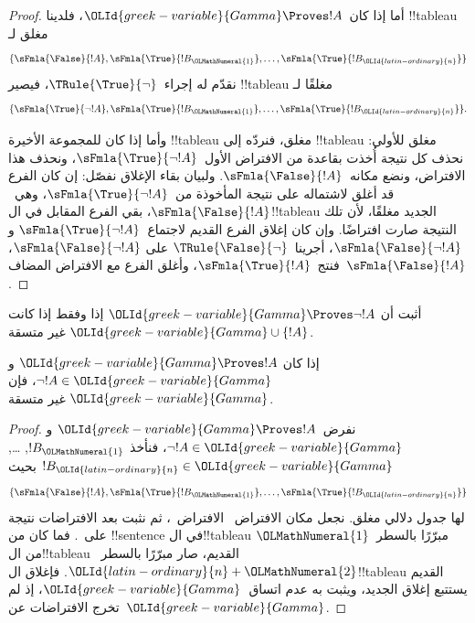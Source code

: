 \documentclass[../../../include/open-logic-section]{subfiles}
\begin{document}
\begin{proof}
أما إذا كان~$\OLId{greek-variable}{Gamma} \Proves !A$، فلدينا !!{tableau} مغلق لـ
\[
\{\sFmla{\False}{!A},
\sFmla{\True}{!B_\OLMathNumeral{1}}, \dots, \sFmla{\True}{!B_\OLId{latin-ordinary}{n}}\}
\]
نقدّم له إجراء~$\TRule{\True}{\lnot}$، فيصير !!{tableau} مغلقًا لـ
\[
\{\sFmla{\True}{\lnot !A},
\sFmla{\True}{!B_\OLMathNumeral{1}}, \dots, \sFmla{\True}{!B_\OLId{latin-ordinary}{n}}\}.
\]

وأما إذا كان للمجموعة الأخيرة !!{tableau} مغلق، فنردّه إلى
!!{tableau} مغلق للأولى: نحذف كل نتيجة أُخذت بقاعدة
\TRule{\True}{\lnot} من الافتراض الأول~$\sFmla{\True}{\lnot !A}$،
ونحذف هذا الافتراض، ونضع مكانه~$\sFmla{\False}{!A}$.
ولبيان بقاء الإغلاق نفصّل: إن كان الفرع قد أغلق لاشتماله على نتيجة
\TRule{\True}{\lnot} المأخوذة من~$\sFmla{\True}{\lnot !A}$،
وهي~$\sFmla{\False}{!A}$، بقي الفرع المقابل في ال!!{tableau} الجديد
مغلقًا، لأن تلك النتيجة صارت افتراضًا. وإن كان إغلاق الفرع القديم
لاجتماع~$\sFmla{\True}{\lnot !A}$ و$\sFmla{\False}{\lnot
  !A}$، أجرينا~$\TRule{\False}{\lnot}$ على
$\sFmla{\False}{\lnot !A}$، فنتج~$\sFmla{\True}{!A}$،
وأغلق الفرع مع الافتراض المضاف~$\sFmla{\False}{!A}$.
\end{proof}

\begin{prob}
أثبت أن $\OLId{greek-variable}{Gamma} \Proves \lnot !A$ إذا وفقط إذا كانت $\OLId{greek-variable}{Gamma} \cup \{!A\}$ غير متسقة.
\end{prob}

\begin{prop}
  إذا كان $\OLId{greek-variable}{Gamma} \Proves !A$ و$\lnot !A \in \OLId{greek-variable}{Gamma}$، فإن $\OLId{greek-variable}{Gamma}$
  غير متسقة.
\end{prop}

\begin{proof}
  نفرض~$\OLId{greek-variable}{Gamma} \Proves !A$ و$\lnot !A \in \OLId{greek-variable}{Gamma}$، فنأخذ
  $!B_\OLMathNumeral{1}$, \dots, $!B_\OLId{latin-ordinary}{n} \in \OLId{greek-variable}{Gamma}$ بحيث
  \[
  \{\sFmla{\False}{!A}, \sFmla{\True}{!B_\OLMathNumeral{1}}, \dots, \sFmla{\True}{!B_\OLId{latin-ordinary}{n}}\}
  \]
  لها جدول دلالي مغلق. نجعل مكان الافتراض~
  الافتراض~، ثم نثبت بعد الافتراضات نتيجة
  \TRule{\True}{\lnot} على~.
  فما كان من !!{sentence} في ال!!{tableau} مبرّرًا بالسطر~$\OLMathNumeral{1}$
  من ال!!{tableau} القديم، صار مبرّرًا بالسطر~$\OLId{latin-ordinary}{n}+\OLMathNumeral{2}$.
  فإغلاق ال!!{tableau} القديم يستتبع إغلاق الجديد، ويثبت به عدم
  اتساق~$\OLId{greek-variable}{Gamma}$، إذ لم تخرج الافتراضات عن~$\OLId{greek-variable}{Gamma}$.
\end{proof}
\end{document}
